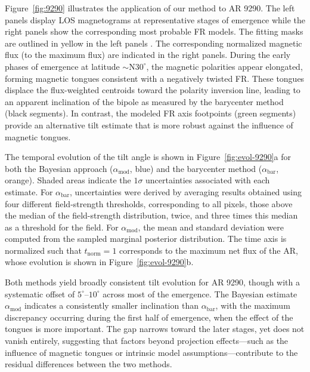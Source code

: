 \documentclass[namedreferences,hyperref,optionalrh]{spr-sola}
\begin{document}
Figure~\ref{fig:9290} illustrates the application of our method to AR 9290. The left panels display LOS magnetograms at representative stages of emergence while the right panels show the corresponding most probable FR models. 
The fitting masks are outlined in yellow in the left panels \citep[see][]{Poisson25}. 
The corresponding normalized magnetic flux (to the maximum flux) are indicated in the right panels. During the early phases of emergence at latitude $\sim$N$30^\circ$, the magnetic polarities appear elongated, forming magnetic tongues consistent with a negatively twisted FR. These tongues displace the flux-weighted centroids toward the polarity inversion line, leading to an apparent inclination of the bipole as measured by the barycenter method (black segments). In contrast, the modeled FR axis footpoints (green segments) provide an alternative tilt estimate that is more robust against the influence of magnetic tongues.

The temporal evolution of the tilt angle is shown in Figure~\ref{fig:evol-9290}a for both the Bayesian approach ($\alpha_\mathrm{mod}$, blue) and the barycenter method ($\alpha_\mathrm{bar}$, orange). Shaded areas indicate the $1\sigma$ uncertainties associated with each estimate. For $\alpha_\mathrm{bar}$, uncertainties were derived by averaging results obtained using four different field-strength thresholds, corresponding to all pixels, those above the median of the field-strength distribution, twice, and three times this median as a threshold for the field. 
For $\alpha_\mathrm{mod}$, the mean and standard deviation were computed from the sampled marginal posterior distribution. The time axis is normalized such that $t_\mathrm{norm}=1$ corresponds to the maximum net flux of the AR, whose evolution is shown in Figure~\ref{fig:evol-9290}b.

Both methods yield broadly consistent tilt evolution for AR 9290, though with a systematic offset of $5^\circ$–$10^\circ$ across most of the emergence. The Bayesian estimate $\alpha_\mathrm{mod}$ indicates a consistently smaller inclination than $\alpha_\mathrm{bar}$, with the maximum discrepancy occurring during the first half of emergence, when the effect of the tongues is more important. The gap narrows toward the later stages, yet does not vanish entirely, suggesting that factors beyond projection effects—such as the influence of magnetic tongues or intrinsic model assumptions—contribute to the residual differences between the two methods.
\end{document}
